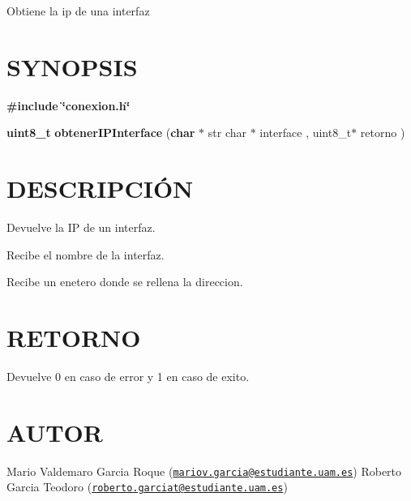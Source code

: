 Obtiene la ip de una interfaz\hypertarget{getTamanoFichero_SYNOPSIS}{}\section{S\-Y\-N\-O\-P\-S\-I\-S}\label{getTamanoFichero_SYNOPSIS}
{\bfseries \#include} {\bfseries \char`\"{}conexion.\-h\char`\"{}} 

{\bfseries uint8\-\_\-t} {\bfseries obtener\-I\-P\-Interface} {\bfseries }({\bfseries char} $\ast$ str char $\ast$ interface {\bfseries }, uint8\-\_\-t$\ast$ retorno {\bfseries })\hypertarget{getTamanoFichero_descripcion}{}\section{D\-E\-S\-C\-R\-I\-P\-C\-IÓ\-N}\label{getTamanoFichero_descripcion}
Devuelve la I\-P de un interfaz.

Recibe el nombre de la interfaz.

Recibe un enetero donde se rellena la direccion.\hypertarget{getTamanoFichero_retorno}{}\section{R\-E\-T\-O\-R\-N\-O}\label{getTamanoFichero_retorno}
Devuelve 0 en caso de error y 1 en caso de exito.\hypertarget{getTamanoFichero_authors}{}\section{A\-U\-T\-O\-R}\label{getTamanoFichero_authors}
Mario Valdemaro Garcia Roque (\href{mailto:mariov.garcia@estudiante.uam.es}{\tt mariov.\-garcia@estudiante.\-uam.\-es}) Roberto Garcia Teodoro (\href{mailto:roberto.garciat@estudiante.uam.es}{\tt roberto.\-garciat@estudiante.\-uam.\-es}) 